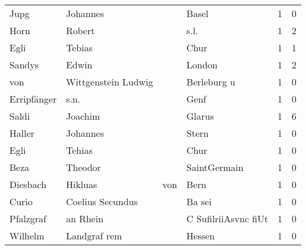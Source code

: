 \begin{center}
\begin{tiny}
\begin{longtabu}{llllrr}
                     Jupg &                           Johannes &             &                                       Basel &          1 &         0 \\
                     Horn &                             Robert &             &                                        s.l. &          1 &         2 \\
                     Egli &                             Tebias &             &                                        Chur &          1 &         1 \\
                   Sandys &                              Edwin &             &                                      London &          1 &         2 \\
                      von &                Wittgenstein Ludwig &             &                                 Berleburg u &          1 &         0 \\
              Erripfänger &                               s.n. &             &                                        Genf &          1 &         0 \\
                    Saldi &                            Joachim &             &                                      Glarus &          1 &         6 \\
                   Haller &                           Johannes &             &                                       Stern &          1 &         0 \\
                     Egli &                             Tehias &             &                                        Chur &          1 &         0 \\
                     Beza &                            Theodor &             &                                SaintGermain &          1 &         0 \\
                 Diesbach &                            Hikluas &         von &                                        Bern &          1 &         0 \\
                    Curio &                   Coelius Secundus &             &                                      Ba sei &          1 &         0 \\
                Pfalzgraf &                           an Rhein &             &                        C SufilriiAsvnc fiUt &          1 &         0 \\
                  Wilhelm &                       Landgraf rem &             &                                      Hessen &          1 &         0 \\

\end{longtabu}
\end{tiny}
\end{center}
